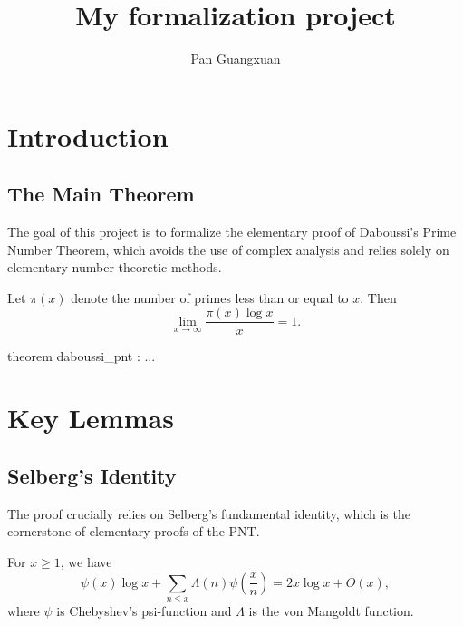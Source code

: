 \documentclass{report}
\title{My formalization project}
\author{Pan Guangxuan}
\begin{document}
\maketitle
\maketitle
\tableofcontents

\chapter{Introduction}

\section{The Main Theorem}

The goal of this project is to formalize the elementary proof of Daboussi's Prime Number Theorem, which avoids the use of complex analysis and relies solely on elementary number-theoretic methods.

\begin{theorem}\label{thm:daboussi_pnt}
  Let $\pi(x)$ denote the number of primes less than or equal to $x$. Then
  \[
  \lim_{x \to \infty} \frac{\pi(x) \log x}{x} = 1.
  \]
\end{theorem}

\begin{leanok}
  theorem daboussi_pnt : ...
\end{leanok}

\chapter{Key Lemmas}

\section{Selberg's Identity}

The proof crucially relies on Selberg's fundamental identity, which is the cornerstone of elementary proofs of the PNT.

\begin{lemma}\label{lem:selberg}
  For $x \geq 1$, we have
  \[
  \psi(x) \log x + \sum_{n \leq x} \Lambda(n) \psi\left(\frac{x}{n}\right) = 2x \log x + O(x),
  \]
  where $\psi$ is Chebyshev's psi-function and $\Lambda$ is the von Mangoldt function.
\end{lemma}
\end{document}
